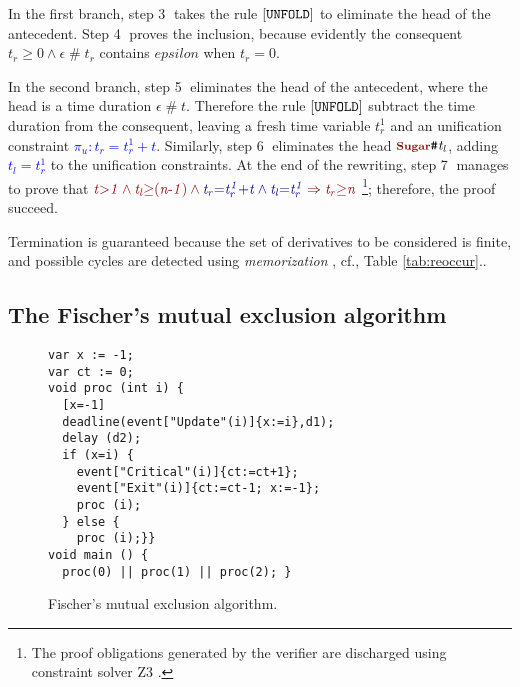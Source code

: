 \documentclass[acmsmall,10pt,review]{acmart}
\newcommand{\anyevent}[1]{{\textcolor{darkred}
{{\textbf{\footnotesize #1}}}}}
\newcommand{\code}[1]{{\tt{\ensuremath{\m{#1}}}}}
\newcommand{\codeme}[1]{{\tt{\ensuremath{#1}}}}
\newcommand{\m}{\mathit}
\newcommand{\mysharp}{{\mathrel{\texttt{\#}}}}
\newcommand\tabref[1]{Table \textcolor{black}{\ref{#1}}.}
\begin{document}
{In the first branch, step \textcircled{3} takes the rule 
$\codeme{[UNFOLD]}$ to eliminate the head of the antecedent. 
Step \textcircled{4} proves the inclusion, because 
evidently the consequent \code{t_r {\geq} 0 \wedge \epsilon \mysharp t_r} 
contains \code{epsilon} when \code{t_r{=}0}. 

In the second branch, step \textcircled{5} eliminates the 
head of the antecedent, where the head is a time duration \code{\epsilon\mysharp t}. 
Therefore the rule $\codeme{[UNFOLD]}$ subtract the time duration 
from the consequent, leaving a fresh time variable \code{t_r^1} and 
an unification constraint \textcolor{blue}{\code{\pi_u : t_r{=}t_r^1 {+}t}}. 
Similarly, step \textcircled{6} eliminates the head 
\code{\anyevent{Sugar}\mysharp t_l}, adding \textcolor{blue}{\code{t_l{=}t_r^1}} 
to the unification constraints. 
At the end of the rewriting, step \textcircled{7} manages to prove that 
\code{\textcolor {darkred}{  t{>}1 \wedge t_l{\geq}(n\text{-}1) 
\wedge  \textcolor{blue}{t_r{=}t_r^1 {+}t \wedge  t_l{=}t_r^1}  \Rightarrow t_r{\geq}n
}  } \footnote{The proof obligations generated by the verifier are discharged using constraint solver Z3 \cite{DBLP:conf/tacas/MouraB08}.}; therefore, the proof succeed.

Termination is guaranteed because the set of derivatives to be considered is finite, and possible cycles are detected using 
\emph{memorization} \cite{DBLP:conf/tableaux/Brotherston05}, cf., \tabref{tab:reoccur}. 


\subsection{The Fischer's mutual exclusion algorithm}




\begin{wrapfigure}{L}{0.53\columnwidth}
  \vspace{-1mm}
\begin{lstlisting}
var x := -1; 
var ct := 0;
void proc (int i) {
  [x=-1] 
  deadline(event["Update"(i)]{x:=i},d1);
  delay (d2);
  if (x=i) {
    event["Critical"(i)]{ct:=ct+1};
    event["Exit"(i)]{ct:=ct-1; x:=-1};
    proc (i);
  } else {
    proc (i);}}
void main () { 
  proc(0) || proc(1) || proc(2); }
\end{lstlisting}  
  \vspace{-1mm}
  \caption{Fischer's mutual exclusion algorithm.}\label{fig:overview_ficher}
     \vspace{-1mm}
\end{wrapfigure}

}
\end{document}

